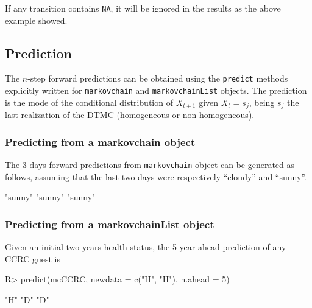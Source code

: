 \documentclass[
  nojss]{jss}
\begin{document}
If any transition contains \texttt{NA}, it will be ignored in the results as the above example showed.

\hypertarget{prediction}{%
\subsection{Prediction}\label{prediction}}

The \(n\)-step forward predictions can be obtained using the \texttt{predict} methods explicitly written for \texttt{markovchain} and \texttt{markovchainList} objects. The prediction is the mode of the conditional distribution of \(X_{t+1}\) given \(X_{t}=s_{j}\), being \(s_{j}\) the last realization of the DTMC (homogeneous or non-homogeneous).

\hypertarget{predicting-from-a-markovchain-object}{%
\subsubsection{Predicting from a markovchain object}\label{predicting-from-a-markovchain-object}}

The 3-days forward predictions from \texttt{markovchain} object can be generated as follows, assuming that the last two days were respectively ``cloudy'' and ``sunny''.

\begin{CodeChunk}


\begin{CodeOutput}
[1] "sunny" "sunny" "sunny"
\end{CodeOutput}
\end{CodeChunk}

\hypertarget{predicting-from-a-markovchainlist-object}{%
\subsubsection{Predicting from a markovchainList object}\label{predicting-from-a-markovchainlist-object}}

Given an initial two years health status, the 5-year ahead prediction of any CCRC guest is

\begin{CodeChunk}

\begin{CodeInput}
R> predict(mcCCRC, newdata = c("H", "H"), n.ahead = 5)
\end{CodeInput}

\begin{CodeOutput}
[1] "H" "D" "D"
\end{CodeOutput}
\end{CodeChunk}
\end{document}
